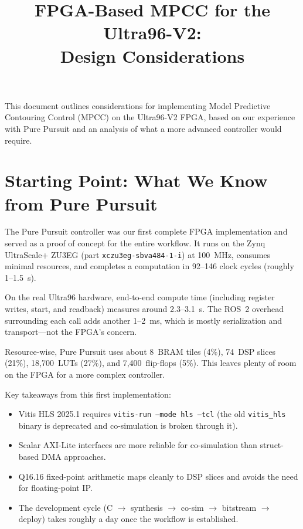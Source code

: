 \documentclass[12pt,a4paper]{article}
\title{FPGA-Based MPCC for the Ultra96-V2:\\Design Considerations}
\author{}
\date{}
\begin{document}
\maketitle

\noindent This document outlines considerations for implementing Model Predictive Contouring Control (MPCC) on the Ultra96-V2 FPGA, based on our experience with Pure Pursuit and an analysis of what a more advanced controller would require.

\tableofcontents
\newpage

\section{Starting Point: What We Know from Pure Pursuit}

The Pure Pursuit controller was our first complete FPGA implementation and served as a proof of concept for the entire workflow. It runs on the Zynq UltraScale+ ZU3EG (part \texttt{xczu3eg-sbva484-1-i}) at 100~MHz, consumes minimal resources, and completes a computation in 92--146 clock cycles (roughly 1--1.5~\textmu s).

On the real Ultra96 hardware, end-to-end compute time (including register writes, start, and readback) measures around 2.3--3.1~\textmu s. The ROS~2 overhead surrounding each call adds another 1--2~ms, which is mostly serialization and transport---not the FPGA's concern.

Resource-wise, Pure Pursuit uses about 8~BRAM tiles (4\%), 74~DSP slices (21\%), 18,700~LUTs (27\%), and 7,400~flip-flops (5\%). This leaves plenty of room on the FPGA for a more complex controller.

Key takeaways from this first implementation:

\begin{itemize}
    \item Vitis HLS 2025.1 requires \texttt{vitis-run --mode hls --tcl} (the old \texttt{vitis\_hls} binary is deprecated and co-simulation is broken through it).
    \item Scalar AXI-Lite interfaces are more reliable for co-simulation than struct-based DMA approaches.
    \item Q16.16 fixed-point arithmetic maps cleanly to DSP slices and avoids the need for floating-point IP.
    \item The development cycle (C $\rightarrow$ synthesis $\rightarrow$ co-sim $\rightarrow$ bitstream $\rightarrow$ deploy) takes roughly a day once the workflow is established.
\end{itemize}
\end{document}
